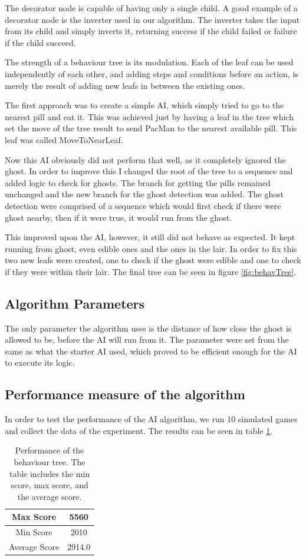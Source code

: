 \documentclass[conference,compsoc]{IEEEtran}
\begin{document}
The decorator node is capable of having only a single child. A good example of a decorator node is the inverter used in our algorithm. The inverter takes the input from its child and simply inverts it, returning success if the child failed or failure if the child succeed.

The strength of a behaviour tree is its modulation. Each of the leaf can be used independently of each other, and adding steps and conditions before an action, is merely the result of adding new leafs in between the existing ones.

The first approach was to create a simple AI, which simply tried to go to the nearest pill and eat it. This was achieved just by having a leaf in the tree which set the move of the tree result to send PacMan to the nearest available pill. This leaf was called MoveToNearLeaf. 

Now this AI obviously did not perform that well, as it completely ignored the ghost. In order to improve this I changed the root of the tree to a sequence and added logic to check for ghosts. The branch for getting the pills remained unchanged and the new branch for the ghost detection was added. The ghost detection were comprised of a sequence which would first check if there were ghost nearby, then if it were true, it would run from the ghost.

This improved upon the AI, however, it still did not behave as expected. It kept running from ghost, even edible ones and the ones in the lair. 
In order to fix this two new leafs were created, one to check if the ghost were edible and one to check if they were within their lair.
The final tree can be seen in figure \ref{fig:behavTree}.

\subsection{Algorithm Parameters}
The only parameter the algorithm uses is the distance of how close the ghost is allowed to be, before the AI will run from it. 
The parameter were set from the same as what the starter AI used, which proved to be efficient enough for the AI to execute its logic. 
\subsection{Performance measure of the algorithm}
In order to test the performance of the AI algorithm, we run 10 simulated games and collect the data of the experiment. The results can be seen in table \ref{tab:behavPer}.
\begin{table}[h]
\begin{center}
\begin{tabular}{|c|c|}
\hline
Max Score & 5560\\
\hline
Min Score & 2010\\
\hline
Average Score & 2914.0\\
\hline
\end{tabular}
\end{center}
\caption{Performance of the behaviour tree. The table includes the min score, max score, and the average score.}
\label{tab:behavPer}
\end{table}
\end{document}
